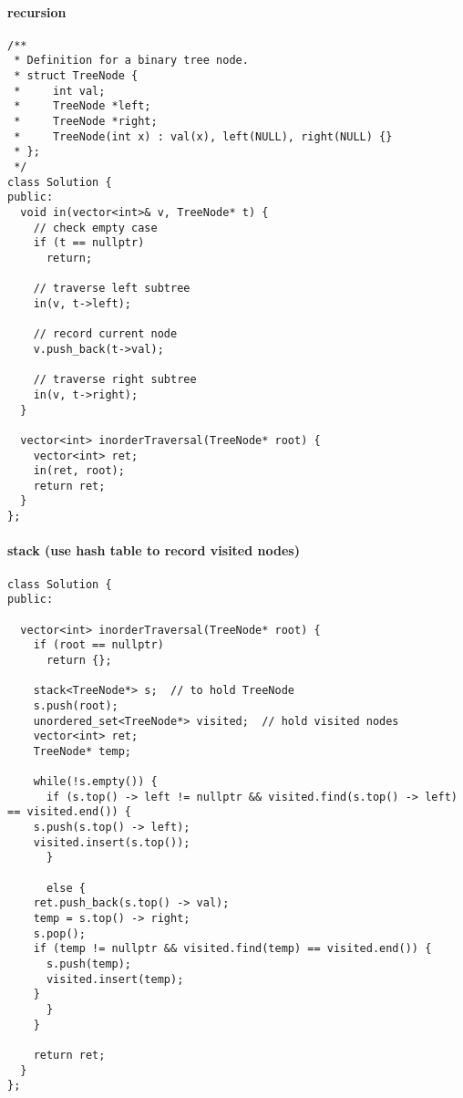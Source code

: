 \documentclass[12pt]{article}
\begin{document}
\paragraph{recursion}
\label{sec:org641d5f9}
\begin{verbatim}
/**
 * Definition for a binary tree node.
 * struct TreeNode {
 *     int val;
 *     TreeNode *left;
 *     TreeNode *right;
 *     TreeNode(int x) : val(x), left(NULL), right(NULL) {}
 * };
 */
class Solution {
public:
  void in(vector<int>& v, TreeNode* t) {
    // check empty case 
    if (t == nullptr)
      return;

    // traverse left subtree
    in(v, t->left);

    // record current node
    v.push_back(t->val);

    // traverse right subtree 
    in(v, t->right);
  }

  vector<int> inorderTraversal(TreeNode* root) {
    vector<int> ret;
    in(ret, root);
    return ret;
  }
};
\end{verbatim}
\paragraph{stack (use hash table to record visited nodes)}
\label{sec:org3c05411}
\begin{verbatim}
class Solution {
public:

  vector<int> inorderTraversal(TreeNode* root) {
    if (root == nullptr)
      return {};

    stack<TreeNode*> s;  // to hold TreeNode
    s.push(root);
    unordered_set<TreeNode*> visited;  // hold visited nodes
    vector<int> ret;
    TreeNode* temp;

    while(!s.empty()) {
      if (s.top() -> left != nullptr && visited.find(s.top() -> left) == visited.end()) {
	s.push(s.top() -> left);
	visited.insert(s.top());
      }

      else {
	ret.push_back(s.top() -> val);
	temp = s.top() -> right;
	s.pop();
	if (temp != nullptr && visited.find(temp) == visited.end()) {
	  s.push(temp);
	  visited.insert(temp);
	}
      }
    }

    return ret;
  }
};
\end{verbatim}
\end{document}
